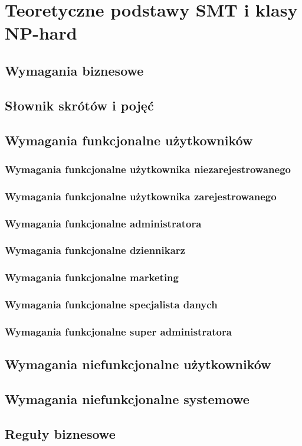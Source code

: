 \chapter{Teoretyczne podstawy SMT i klasy NP-hard}
\section{Wymagania biznesowe}
\section{Słownik skrótów i pojęć}
\cite{java_fundamentals}
\section{Wymagania funkcjonalne użytkowników}
\subsection{Wymagania funkcjonalne użytkownika niezarejestrowanego}
\subsection{Wymagania funkcjonalne użytkownika zarejestrowanego}
\subsection{Wymagania funkcjonalne administratora}
\subsection{Wymagania funkcjonalne dziennikarz}
\subsection{Wymagania funkcjonalne marketing}
\subsection{Wymagania funkcjonalne specjalista danych}
\subsection{Wymagania funkcjonalne super administratora}
\section{Wymagania niefunkcjonalne użytkowników}
\section{Wymagania niefunkcjonalne systemowe}
\section{Reguły biznesowe}
\cite{java17doc}

